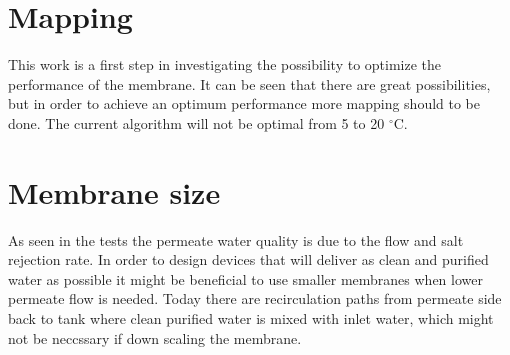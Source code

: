 

\section{Mapping}
This work is a first step in investigating the possibility to optimize the performance of the membrane. It can be seen that there are great possibilities, but in order to achieve an optimum performance more mapping should to be done. The current algorithm will not be optimal from 5 to 20 $^{\circ}$C.  


\section{Membrane size}
As seen in the tests the permeate water quality is due to the flow and salt rejection rate. In order to design devices that will deliver as clean and purified water as possible it might be beneficial to use smaller membranes when lower permeate flow is needed. Today there are recirculation paths from permeate side back to tank where clean purified water is mixed with inlet water, which might not be neccssary if down scaling the membrane.










